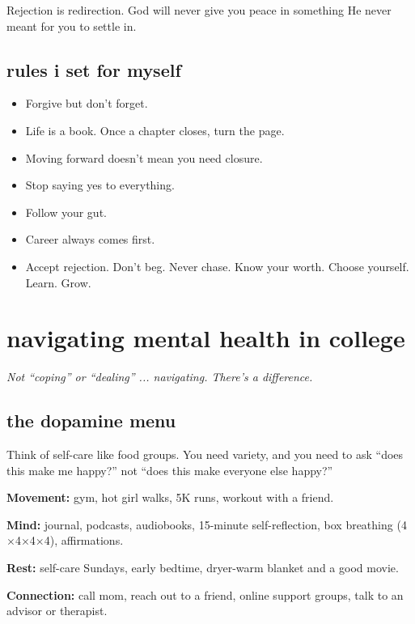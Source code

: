 \documentclass[12pt, letterpaper]{article}
\newenvironment{jadequote}{%
  \begin{mdframed}[backgroundcolor=soft, linecolor=moxie, linewidth=1pt,
    innerleftmargin=10pt, innerrightmargin=10pt,
    innertopmargin=8pt, innerbottommargin=8pt]
  \itshape
}{%
  \end{mdframed}
}
\begin{document}
\begin{jadequote}
Rejection is redirection. God will never give you peace in something He never meant for you to settle in.
\end{jadequote}

\subsection{rules i set for myself}
\begin{itemize}
  \item Forgive but don't forget.
  \item Life is a book. Once a chapter closes, turn the page.
  \item Moving forward doesn't mean you need closure.
  \item Stop saying yes to everything.
  \item Follow your gut.
  \item Career always comes first.
  \item Accept rejection. Don't beg. Never chase. Know your worth. Choose yourself. Learn. Grow.
\end{itemize}

\section{navigating mental health in college}

\textit{Not ``coping'' or ``dealing'' ... navigating. There's a difference.}

\subsection{the dopamine menu}

Think of self-care like food groups. You need variety, and you need to ask ``does this make me happy?'' not ``does this make everyone else happy?''

\textbf{Movement:} gym, hot girl walks, 5K runs, workout with a friend.

\textbf{Mind:} journal, podcasts, audiobooks, 15-minute self-reflection, box breathing (4$\times$4$\times$4$\times$4), affirmations.

\textbf{Rest:} self-care Sundays, early bedtime, dryer-warm blanket and a good movie.

\textbf{Connection:} call mom, reach out to a friend, online support groups, talk to an advisor or therapist.
\end{document}
